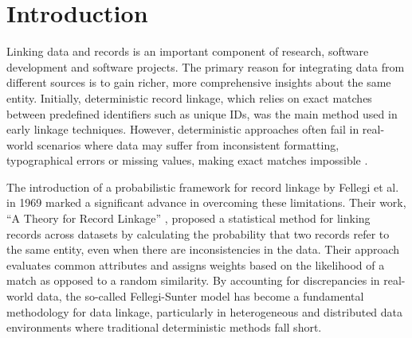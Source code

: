 \chapter{Introduction}  \label{sec:introduction}

%


Linking data and records is an important component of research, software development and software projects.
The primary reason for integrating data from different sources is to gain richer, more comprehensive insights about the same entity.
Initially, deterministic record linkage, which relies on exact matches between predefined identifiers such as unique IDs, was the main method used in early linkage techniques. 
However, deterministic approaches often fail in real-world scenarios where data may suffer from inconsistent formatting, typographical errors or missing values, making exact matches impossible \cite{herzog2007data}.

The introduction of a probabilistic framework for record linkage by Fellegi et al. in 1969 \cite{fellegi1969theory} marked a significant advance in overcoming these limitations. 
Their work, \enquote{A Theory for Record Linkage} \cite{fellegi1969theory}, proposed a statistical method for linking records across datasets by calculating the probability that two records refer to the same entity, even when there are inconsistencies in the data. 
Their approach evaluates common attributes and assigns weights based on the likelihood of a match as opposed to a random similarity. 
By accounting for discrepancies in real-world data, the so-called Fellegi-Sunter model has become a fundamental methodology for data linkage, particularly in heterogeneous and distributed data environments where traditional deterministic methods fall short.

